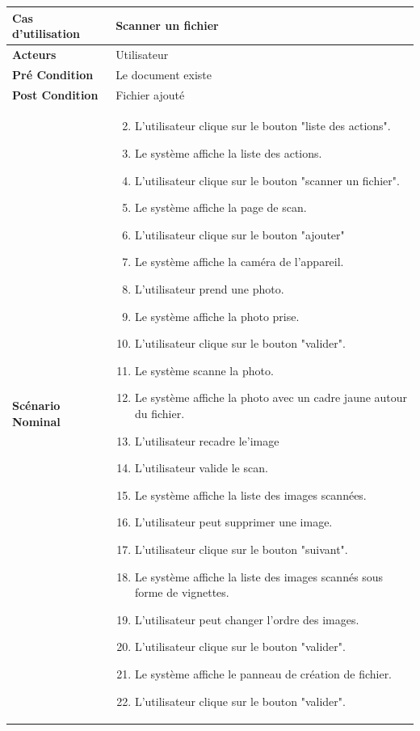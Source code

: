 \begin{longtable}{|p{5cm}|p{10cm}|}
\hline
\textbf{Cas d'utilisation}&Scanner un fichier\\
\hline
\textbf{Acteurs}&Utilisateur\\
\hline
\textbf{Pré Condition}&Le document existe\\
\hline
\textbf{Post Condition}&Fichier ajouté\\
\hline
\textbf{Scénario Nominal}&
\vspace{-\baselineskip}
\begin{enumerate}
    \setcounter{enumi}{1}
    \item L'utilisateur clique sur le bouton "liste des actions".
    \item Le système affiche la liste des actions.
    \item L'utilisateur clique sur le bouton "scanner un fichier".
    \item Le système affiche la page de scan.
    \item L'utilisateur clique sur le bouton "ajouter"
    \item Le système affiche la caméra de l'appareil.
    \item L'utilisateur prend une photo.
    \item Le système affiche la photo prise.
    \item L'utilisateur clique sur le bouton "valider".
    \item Le système scanne la photo.
    \item Le système affiche la photo avec un cadre jaune autour du fichier.
    \item L'utilisateur recadre le'image
    \item L'utilisateur valide le scan.
    \item Le système affiche la liste des images scannées.
    \item L'utilisateur peut supprimer une image.
    \item L'utilisateur clique sur le bouton "suivant".
    \item Le système affiche la liste des images scannés sous forme de vignettes.
    \item L'utilisateur peut changer l'ordre des images.
    \item L'utilisateur clique sur le bouton "valider".
    \item Le système affiche le panneau de création de fichier.
    \item L'utilisateur clique sur le bouton "valider".

\end{enumerate}
\end{longtable}
